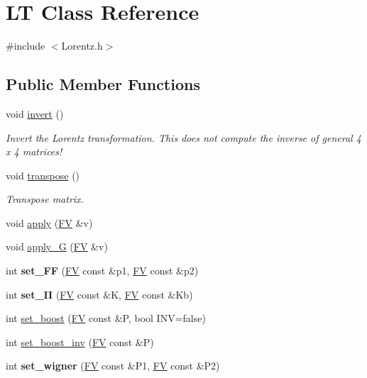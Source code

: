 \hypertarget{classLT}{\section{L\-T Class Reference}
\label{classLT}
}


{\ttfamily \#include $<$Lorentz.\-h$>$}

\subsection*{Public Member Functions}
\begin{DoxyCompactItemize}
\item 
\hypertarget{classLT_a7467f60d847896710f21c17be6ee0b2c}{void \hyperlink{classLT_a7467f60d847896710f21c17be6ee0b2c}{invert} ()}\label{classLT_a7467f60d847896710f21c17be6ee0b2c}

\begin{DoxyCompactList}\small\item\em Invert the Lorentz transformation. This does not compute the inverse of general 4 x 4 matrices! \end{DoxyCompactList}\item 
\hypertarget{classLT_a6142dba94f0edc4eb2f8a0cc84a43ada}{void \hyperlink{classLT_a6142dba94f0edc4eb2f8a0cc84a43ada}{transpose} ()}\label{classLT_a6142dba94f0edc4eb2f8a0cc84a43ada}

\begin{DoxyCompactList}\small\item\em Transpose matrix. \end{DoxyCompactList}\item 
void \hyperlink{classLT_a3119b968c2cf6a9bbfb30615c01921d0}{apply} (\hyperlink{classFV}{F\-V} \&v)
\item 
void \hyperlink{classLT_abd17d410a8436a83b03f2dd2909ee59a}{apply\-\_\-\-G} (\hyperlink{classFV}{F\-V} \&v)
\item 
\hypertarget{classLT_acdccba2ab08b071219626bafb85f8e21}{int {\bfseries set\-\_\-\-F\-F} (\hyperlink{classFV}{F\-V} const \&p1, \hyperlink{classFV}{F\-V} const \&p2)}\label{classLT_acdccba2ab08b071219626bafb85f8e21}

\item 
\hypertarget{classLT_ac2718d29c891a91aa5058dc929ffecdd}{int {\bfseries set\-\_\-\-I\-I} (\hyperlink{classFV}{F\-V} const \&K, \hyperlink{classFV}{F\-V} const \&Kb)}\label{classLT_ac2718d29c891a91aa5058dc929ffecdd}

\item 
int \hyperlink{classLT_a0f1f4b9fb6a2b084908abb6bc687cd4f}{set\-\_\-boost} (\hyperlink{classFV}{F\-V} const \&P, bool I\-N\-V=false)
\item 
int \hyperlink{classLT_a84cf79cd6014d4ecc645c1dcc0258b5e}{set\-\_\-boost\-\_\-inv} (\hyperlink{classFV}{F\-V} const \&P)
\item 
\hypertarget{classLT_a5a8d17a0e9374ba9cef862c1f98a5d62}{int {\bfseries set\-\_\-wigner} (\hyperlink{classFV}{F\-V} const \&P1, \hyperlink{classFV}{F\-V} const \&P2)}\label{classLT_a5a8d17a0e9374ba9cef862c1f98a5d62}


\end{DoxyCompactItemize}

